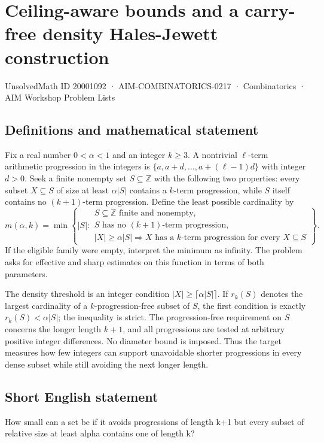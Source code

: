 \documentclass[11pt,a4paper]{article}
\begin{document}
\section*{Ceiling-aware bounds and a carry-free density Hales-Jewett construction}\label{20001092}
{\small UnsolvedMath ID 20001092 · AIM-COMBINATORICS-0217 · Combinatorics · AIM Workshop Problem Lists}
\subsection{Definitions and mathematical statement}
Fix a real number $0<\alpha<1$ and an integer $k\ge3$.
A nontrivial $\ell$-term arithmetic progression in the integers is
$\{a,a+d,\ldots,a+(\ell-1)d\}$ with integer $d>0$.
Seek a finite nonempty set $S\subseteq\mathbb Z$ with the following
two properties: every subset $X\subseteq S$ of size at least
$\alpha|S|$ contains a $k$-term progression, while $S$ itself
contains no $(k+1)$-term progression.
Define the least possible cardinality by
\[
 m(\alpha,k)=\min\left\{|S|:
 \begin{array}{l}
 S\subseteq\mathbb Z\text{ finite and nonempty},\\
 S\text{ has no }(k+1)\text{-term progression},\\
 |X|\ge\alpha|S|\Rightarrow X\text{ has a }k\text{-term progression}
 \text{ for every }X\subseteq S
 \end{array}\right\}.
\]
If the eligible family were empty, interpret the minimum as infinity.
The problem asks for effective and sharp estimates on this function
in terms of both parameters.

The density threshold is an integer condition
$|X|\ge\lceil\alpha|S|\rceil$. If $r_k(S)$ denotes the largest
cardinality of a $k$-progression-free subset of $S$, the first
condition is exactly $r_k(S)<\alpha|S|$; the inequality is strict.
The progression-free requirement on $S$ concerns the longer length
$k+1$, and all progressions are tested at arbitrary positive integer
differences. No diameter bound is imposed. Thus the target measures
how few integers can support unavoidable shorter progressions in
every dense subset while still avoiding the next longer length.
\subsection{Short English statement}
How small can a set be if it avoids progressions of length k+1 but every subset of relative size at least alpha contains one of length k?
\end{document}

